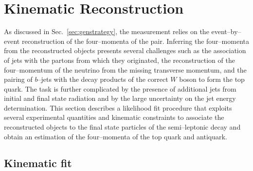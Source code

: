 \chapter{Kinematic Reconstruction}
\label{sec:reconstruction}

As discussed in Sec.~\ref{sec:genstrategy}, the \ac{} measurement relies on
the event--by--event reconstruction of the four--momenta of the
\ttbar{} pair. Inferring the four--momenta from the
reconstructed objects presents several challenges such as the
association of jets with
the partons from which they originated, the reconstruction of the
four--momentum of the neutrino from the missing transverse momentum,
and the pairing of $b$--jets with the decay products of the correct $W$
boson to form the top quark. The task is further complicated by the
presence of additional jets from initial and final state radiation and
by the large uncertainty on the jet energy determination. 
This section describes a likelihood fit procedure that exploits
several experimental quantities and kinematic constraints to associate
the reconstructed objects to the final state particles of the
semi--leptonic \ttbar{} decay and obtain an estimation of the
four--momenta of the top quark and antiquark. 

\section{Kinematic fit}

